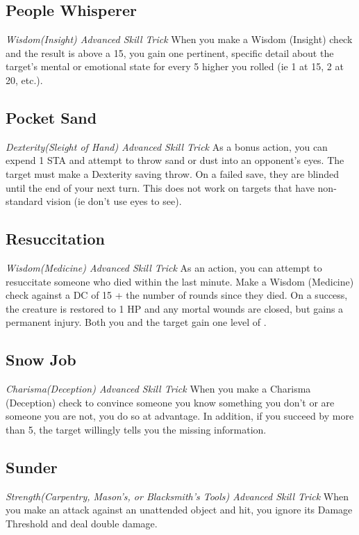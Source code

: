 \subsection{People Whisperer}
\textit{Wisdom(Insight) Advanced Skill Trick}
When you make a Wisdom (Insight) check and the result is above a 15, you gain one pertinent, specific detail about the target's mental or emotional state for every 5 higher you rolled (ie 1 at 15, 2 at 20, etc.).

\subsection{Pocket Sand}
\textit{Dexterity(Sleight of Hand) Advanced Skill Trick}
As a bonus action, you can expend 1 STA and attempt to throw sand or dust into an opponent's eyes. The target must make a Dexterity saving throw. On a failed save, they are blinded until the end of your next turn. This does not work on targets that have non-standard vision (ie don't use eyes to see).

\subsection{Resuccitation}
\textit{Wisdom(Medicine) Advanced Skill Trick}
As an action, you can attempt to resuccitate someone who died within the last minute. Make a Wisdom (Medicine) check against a DC of 15 + the number of rounds since they died. On a success, the creature is restored to 1 HP and any mortal wounds are closed, but gains a permanent injury. Both you and the target gain one level of . 

\subsection{Snow Job}
\textit{Charisma(Deception) Advanced Skill Trick}
When you make a Charisma (Deception) check to convince someone you know something you don't or are someone you are not, you do so at advantage. In addition, if you succeed by more than 5, the target willingly tells you the missing information.

\subsection{Sunder}
\textit{Strength(Carpentry, Mason's, or Blacksmith's Tools) Advanced Skill Trick}
When you make an attack against an unattended object and hit, you ignore its Damage Threshold and deal double damage. 

